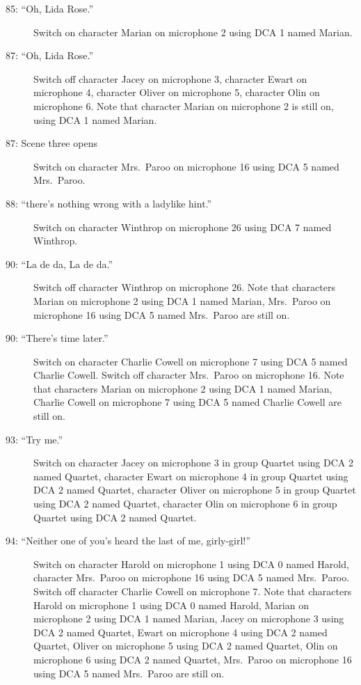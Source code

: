 \begin{description}
\item[85: ``Oh, Lida Rose.'']
Switch on character Marian on microphone 2 using DCA 1 named Marian. 

\item[87: ``Oh, Lida Rose.'']
Switch off character Jacey on microphone 3, character Ewart on microphone 4, character Oliver on microphone 5, character Olin on microphone 6. Note that character Marian on microphone 2 is still on, using DCA 1 named Marian.

\item[87: Scene three opens]
Switch on character Mrs.~Paroo on microphone 16 using DCA 5 named Mrs.~Paroo. 

\item[88: ``there's nothing wrong with a ladylike hint.'']
Switch on character Winthrop on microphone 26 using DCA 7 named Winthrop. 

\item[90: ``La de da, La de da.'']
Switch off character Winthrop on microphone 26. Note that characters Marian on microphone 2 using DCA 1 named Marian, Mrs.~Paroo on microphone 16 using DCA 5 named Mrs.~Paroo are still on.  

\item[90: ``There's time later.'']
Switch on character Charlie Cowell on microphone 7 using DCA 5 named Charlie Cowell. Switch off character Mrs.~Paroo on microphone 16. Note that characters Marian on microphone 2 using DCA 1 named Marian, Charlie Cowell on microphone 7 using DCA 5 named Charlie Cowell are still on.  

\item[93: ``Try me.'']
Switch on character Jacey on microphone 3 in group Quartet using DCA 2 named Quartet, character Ewart on microphone 4 in group Quartet using DCA 2 named Quartet, character Oliver on microphone 5 in group Quartet using DCA 2 named Quartet, character Olin on microphone 6 in group Quartet using DCA 2 named Quartet. 

\item[94: ``Neither one of you's heard the last of me, girly-girl!'']
Switch on character Harold on microphone 1 using DCA 0 named Harold, character Mrs.~Paroo on microphone 16 using DCA 5 named Mrs.~Paroo. Switch off character Charlie Cowell on microphone 7. Note that characters Harold on microphone 1 using DCA 0 named Harold, Marian on microphone 2 using DCA 1 named Marian, Jacey on microphone 3 using DCA 2 named Quartet, Ewart on microphone 4 using DCA 2 named Quartet, Oliver on microphone 5 using DCA 2 named Quartet, Olin on microphone 6 using DCA 2 named Quartet, Mrs.~Paroo on microphone 16 using DCA 5 named Mrs.~Paroo are still on.  


\end{description}
